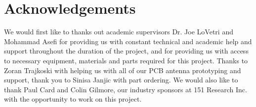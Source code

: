 
\chapter*{Acknowledgements}
 We would first like to thanks out academic supervisors Dr. Joe LoVetri and Mohammad Asefi for providing us with constant technical and academic help and support throughout the duration of the project, and for providing us with access to necessary equipment, materials and parts required for this project. Thanks to Zoran Trajkoski with helping us with all of our PCB antenna prototyping and support, thank you to Sinisa Janjic with part ordering.
We would also like to thank Paul Card and Colin Gilmore, our industry sponsors at 151 Research Inc. with the opportunity to work on this project.
